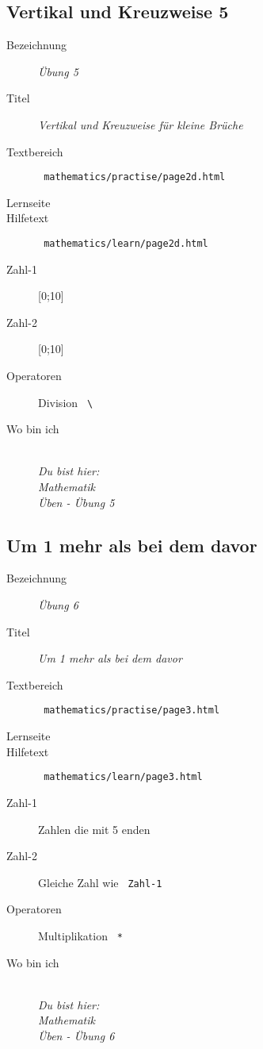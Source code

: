 \subsection{ Vertikal und Kreuzweise 5 }
\label{cha:math-practise-page6}
\begin{description}
  \item[Bezeichnung] \emph{ Übung 5 }
  \item[Titel] \emph{ Vertikal und Kreuzweise für kleine Brüche }
  \item[Textbereich] \texttt{ mathematics/practise/page2d.html }
  \item[Lernseite] 
  \item[Hilfetext] \texttt{ mathematics/learn/page2d.html }
  \item[Zahl-1] [0;10]
  \item[Zahl-2] [0;10]
  \item[Operatoren] Division \texttt{ \textbackslash }
  \item[Wo bin ich] \emph{\\Du bist hier:\\Mathematik\\Üben - Übung 5}
\end{description}


\subsection{ Um 1 mehr als bei dem davor }
\label{cha:math-practise-page7}
\begin{description}
  \item[Bezeichnung] \emph{ Übung 6 }
  \item[Titel] \emph{ Um 1 mehr als bei dem davor }
  \item[Textbereich] \texttt{ mathematics/practise/page3.html }
  \item[Lernseite] 
  \item[Hilfetext] \texttt{ mathematics/learn/page3.html }
  \item[Zahl-1] Zahlen die mit 5 enden
  \item[Zahl-2] Gleiche Zahl wie \texttt{ Zahl-1 }
  \item[Operatoren] Multiplikation \texttt{ * }
  \item[Wo bin ich] \emph{\\Du bist hier:\\Mathematik\\Üben - Übung 6}
\end{description}


